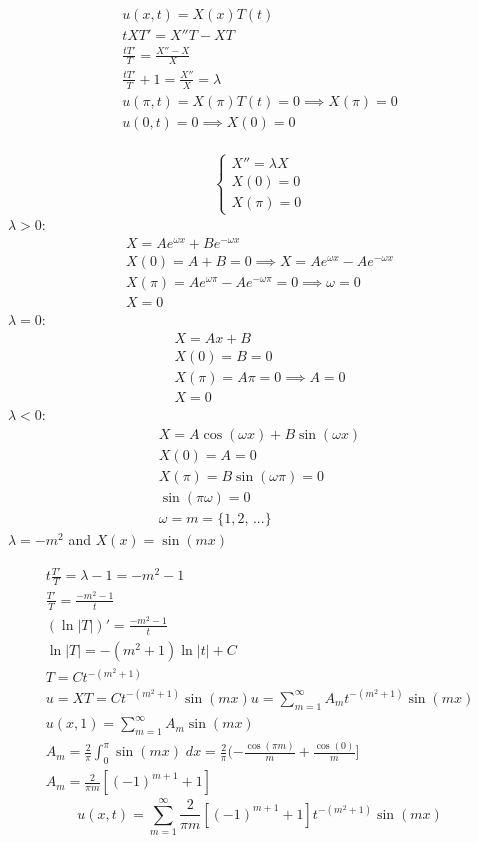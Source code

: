 \documentclass[10pt]{article}
\begin{document}
\begin{gather*}
    u(x, t) = X(x)T(t)\\
    tXT' = X''T - XT\\
    \frac{tT'}{T} = \frac{X'' - X}{X}\\
    \frac{tT'}{T} + 1 = \frac{X''}{X} =\lambda\\
    u(\pi, t) = X(\pi)T(t) = 0 \implies X(\pi) = 0\\
    u(0, t) = 0 \implies X(0) = 0\\
\end{gather*}

\[\begin{cases}
    X'' = \lambda X\\
    X(0) = 0\\
    X(\pi) = 0
\end{cases}\]
$\lambda > 0$:
\begin{gather*}
    X = Ae^{\omega x} + Be^{-\omega x}\\
    X(0) = A + B = 0 \implies X = Ae^{\omega x} -Ae^{-\omega x}\\
    X(\pi) = Ae^{\omega \pi} - Ae^{-\omega \pi} = 0 \implies \omega = 0\\
    X = 0
\end{gather*}
$\lambda = 0$:
\begin{gather*}
    X = Ax + B\\
    X(0) = B = 0\\
    X(\pi) = A\pi = 0 \implies A = 0\\
    X = 0
\end{gather*}
$\lambda < 0$:
\begin{gather*}
    X = A\cos(\omega x) + B\sin(\omega x)\\
    X(0) = A = 0\\
    X(\pi) = B\sin(\omega \pi) = 0\\
    \sin(\pi \omega) = 0\\
    \omega = m = \{1,2,\, ...\}
\end{gather*}
$\lambda = -m^2$ and $X(x) = \sin(mx)$

\begin{gather*}
    t\frac{T'}{T} = \lambda - 1 = -m^2 - 1\\
    \frac{T'}{T} = \frac{-m^2 - 1}{t}\\
    (\ln |T|)' = \frac{-m^2 - 1}{t}\\
    \ln |T| = -(m^2 + 1)\ln|t| + C\\
    T = Ct^{-(m^2 + 1)}\\
    u = XT = Ct^{-(m^2 + 1)}\sin(mx)
    u = \sum_{m=1}^\infty A_mt^{-(m^2 + 1)}\sin(mx)\\
    u(x, 1) = \sum_{m=1}^\infty A_m \sin(mx)\\
    A_m = \frac{2}{\pi} \int_0^\pi \sin(mx)\; dx = \frac{2}{\pi}(-\frac{\cos(\pi m)}{m} + \frac{\cos(0)}{m}]\\
    A_m = \frac{2}{\pi m}[(-1)^{m+1} + 1]
\end{gather*}
\[u(x, t) = \sum_{m=1}^\infty \frac{2}{\pi m}[(-1)^{m+1} + 1]t^{-(m^2 + 1)}\sin(mx)\]
\end{document}
